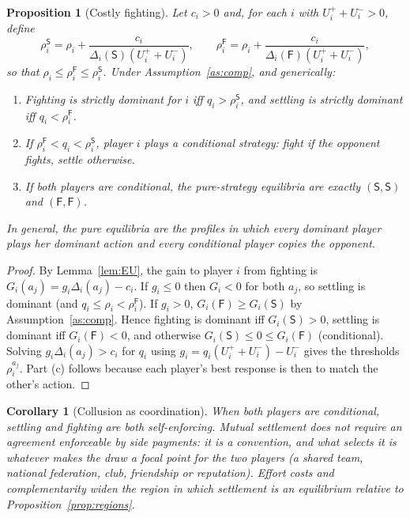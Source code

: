 \documentclass[11pt]{article}
\newtheorem{proposition}{Proposition}
\newtheorem{corollary}{Corollary}
\theoremstyle{definition}
\newcommand{\Sset}{\mathsf{S}}   %
\newcommand{\Fset}{\mathsf{F}}   %
\begin{document}
\begin{proposition}[Costly fighting]\label{prop:cost}
Let $c_i>0$ and, for each $i$ with $U_i^{+}+U_i^{-}>0$, define
\[
\rho_i^{\Sset}=\rho_i+\frac{c_i}{\Delta_i(\Sset)(U_i^{+}+U_i^{-})},\qquad
\rho_i^{\Fset}=\rho_i+\frac{c_i}{\Delta_i(\Fset)(U_i^{+}+U_i^{-})},
\]
so that $\rho_i\le\rho_i^{\Fset}\le\rho_i^{\Sset}$. Under
Assumption~\ref{as:comp}, and generically:
\begin{enumerate}
\item[(a)] Fighting is strictly dominant for $i$ iff $q_i>\rho_i^{\Sset}$,
and settling is strictly dominant iff $q_i<\rho_i^{\Fset}$.
\item[(b)] If $\rho_i^{\Fset}<q_i<\rho_i^{\Sset}$, player $i$ plays a
\emph{conditional} strategy: fight if the opponent fights, settle otherwise.
\item[(c)] If both players are conditional, the pure-strategy equilibria are
exactly $(\Sset,\Sset)$ and $(\Fset,\Fset)$.
\end{enumerate}
In general, the pure equilibria are the profiles in which every dominant player
plays her dominant action and every conditional player copies the opponent.
\end{proposition}

\begin{proof}
By Lemma~\ref{lem:EU}, the gain to player $i$ from fighting is
$G_i(a_j)=g_i\Delta_i(a_j)-c_i$. If $g_i\le0$ then $G_i<0$ for both $a_j$,
so settling is dominant (and $q_i\le\rho_i<\rho_i^{\Fset}$). If $g_i>0$,
$G_i(\Fset)\ge G_i(\Sset)$ by Assumption~\ref{as:comp}. Hence fighting is
dominant iff $G_i(\Sset)>0$, settling is dominant iff $G_i(\Fset)<0$, and
otherwise $G_i(\Sset)\le 0\le G_i(\Fset)$ (conditional). Solving
$g_i\Delta_i(a_j)>c_i$ for $q_i$ using $g_i=q_i(U_i^{+}+U_i^{-})-U_i^{-}$
gives the thresholds $\rho_i^{a_j}$. Part (c) follows because each player's
best response is then to match the other's action.
\end{proof}

\begin{corollary}[Collusion as coordination]\label{cor:coord}
When both players are conditional, settling and fighting are both
self-enforcing. Mutual settlement does not require an agreement enforceable by
side payments: it is a convention, and what selects it is whatever makes the
draw a focal point for the two players (a shared team, national federation,
club, friendship or reputation). Effort costs and complementarity widen the
region in which settlement is an equilibrium relative to
Proposition~\ref{prop:regions}.
\end{corollary}
\end{document}
